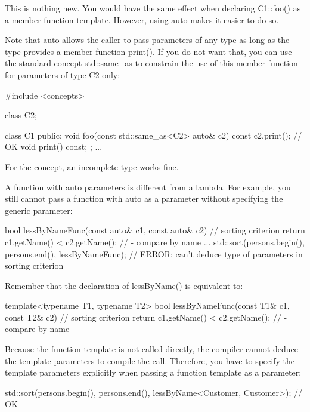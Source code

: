 This is nothing new. You would have the same effect when declaring C1::foo() as a member function template. However, using auto makes it easier to do so.

Note that auto allows the caller to pass parameters of any type as long as the type provides a member function print(). If you do not want that, you can use the standard concept std::same\_as to constrain the use of this member function for parameters of type C2 only:

\begin{cpp}
#include <concepts>

class C2;

class C1 {
	public:
	void foo(const std::same_as<C2> auto& c2) const {
		c2.print(); // OK
	}
	void print() const;
};
...
\end{cpp}

For the concept, an incomplete type works fine.


A function with auto parameters is different from a lambda. For example, you still cannot pass a function with auto as a parameter without specifying the generic parameter:

\begin{cpp}
bool lessByNameFunc(const auto& c1, const auto& c2) { // sorting criterion
	return c1.getName() < c2.getName(); // - compare by name
}
...
std::sort(persons.begin(), persons.end(),
		  lessByNameFunc); // ERROR: can’t deduce type of parameters in sorting criterion
\end{cpp}

Remember that the declaration of lessByName() is equivalent to:

\begin{cpp}
template<typename T1, typename T2>
bool lessByNameFunc(const T1& c1, const T2& c2) { // sorting criterion
	return c1.getName() < c2.getName(); // - compare by name
}
\end{cpp}

Because the function template is not called directly, the compiler cannot deduce the template parameters to compile the call. Therefore, you have to specify the template parameters explicitly when passing a function template as a parameter:

\begin{cpp}
std::sort(persons.begin(), persons.end(),
		  lessByName<Customer, Customer>); // OK
\end{cpp}

